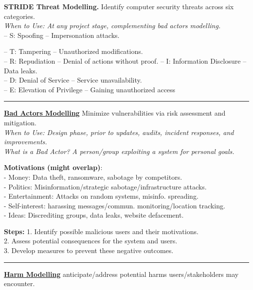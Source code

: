 \documentclass[8pt, a4paper]{extarticle}
\makeatletter
\renewcommand{\hline}{\noalign{\vskip 2px}\hrule\@height\arrayrulewidth\@width\linewidth\noalign{\vskip 2px}}
\makeatother
\begin{document}
\begin{minipage}[t]{0.49\textwidth}
{\begin{minipage}[t]{1\textwidth}
\begin{minipage}[t]{0.5\textwidth}
				\textbf{STRIDE Threat Modelling.} Identify computer security threats across six categories.\\
				\textit{When to Use: At any project stage, complementing bad actors modelling.}\\
				– S: Spoofing – Impersonation attacks.
			\end{minipage}
			\begin{minipage}[t]{0.5\textwidth}
				– T: Tampering – Unauthorized modifications.\\
				– R: Repudiation – Denial of actions without proof.
				– I: Information Disclosure – Data leaks.\\
				– D: Denial of Service – Service unavailability.\\
				– E: Elevation of Privilege – Gaining unauthorized access
			\end{minipage}
			\hline
			\ul{\textbf{Bad Actors Modelling}} Minimize vulnerabilities via risk assessment and mitigation.\\
			\textit{When to Use: Design phase, prior to updates, audits, incident responses, and improvements.}\\
			\textit{What is a Bad Actor? A person/group exploiting a system for personal goals.}\\
			\begin{minipage}[htp]{0.67\textwidth}
				\small
				\textbf{Motivations (might overlap)}:\\
				- Money: Data theft, ransomware, sabotage by competitors.\\
				- Politics: Misinformation/strategic sabotage/infrastructure attacks.\\
				- Entertainment: Attacks on random systems, misinfo. spreading.\\
				- Self-interest: harassing messages/commun. monitoring/location tracking.\\
				- Ideas: Discrediting groups, data leaks, website defacement.
			\end{minipage}
			\begin{minipage}[htp]{0.32\textwidth}
				\textbf{Steps:}
				\small
				1. Identify possible malicious users and their motivations.\\
				2. Assess potential consequences for the system and users.\\
				3. Develop measures to prevent these negative outcomes.
			\end{minipage}
			\hline
			\small
			\ul{\textbf{Harm Modelling}} anticipate/address potential harms users/stakeholders may encounter.\\

\end{minipage}}
\end{minipage}
\end{document}
